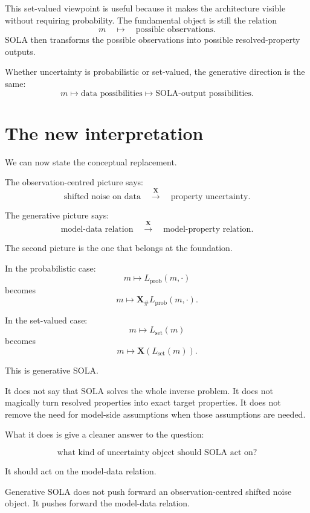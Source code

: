 \documentclass[11pt,openany]{book}
\theoremstyle{definition}
\theoremstyle{remark}
\begin{document}
This set-valued viewpoint is useful because it makes the architecture visible without requiring
probability. The fundamental object is still the relation
\[
  m
  \quad\longmapsto\quad
  \text{possible observations}.
\]
SOLA then transforms the possible observations into possible resolved-property outputs.

\begin{checkpointbox}
Whether uncertainty is probabilistic or set-valued, the generative direction is the same:
\[
  m
  \longmapsto
  \text{data possibilities}
  \longmapsto
  \text{SOLA-output possibilities}.
\]
\end{checkpointbox}

\section{The new interpretation}

We can now state the conceptual replacement.

The observation-centred picture says:
\[
  \text{shifted noise on data}
  \quad
  \xrightarrow{\;\mathbf X\;}
  \quad
  \text{property uncertainty}.
\]

The generative picture says:
\[
  \text{model-data relation}
  \quad
  \xrightarrow{\;\mathbf X\;}
  \quad
  \text{model-property relation}.
\]

The second picture is the one that belongs at the foundation.

In the probabilistic case:
\[
  m\mapsto L_{\mathrm{prob}}(m,\cdot)
\]
becomes
\[
  m\mapsto \mathbf X_{\#}L_{\mathrm{prob}}(m,\cdot).
\]

In the set-valued case:
\[
  m\mapsto L_{\mathrm{set}}(m)
\]
becomes
\[
  m\mapsto \mathbf X(L_{\mathrm{set}}(m)).
\]

This is generative SOLA.

It does not say that SOLA solves the whole inverse problem. It does not magically turn resolved
properties into exact target properties. It does not remove the need for model-side assumptions
when those assumptions are needed.

What it does is give a cleaner answer to the question:

\[
  \text{what kind of uncertainty object should SOLA act on?}
\]

It should act on the model-data relation.

\begin{lessonbox}
Generative SOLA does not push forward an observation-centred shifted noise object. It pushes
forward the model-data relation.
\end{lessonbox}
\end{document}
